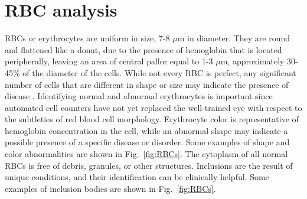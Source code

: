 \documentclass[final,a4paper,12pt,english]{UnicaPhdThesis3}
\begin{document}
{%
%

\chapter{RBC analysis}
RBCs or erythrocytes are uniform in size, 7-8 $\mu$m in diameter. They are round and flattened like a donut, due to the presence of hemoglobin that is located peripherally, leaving an area of central pallor equal to 1-3 $\mu$m, approximately 30-45\% of the diameter of the cells. While not every RBC is perfect, any significant number of cells that are different in shape or size may indicate the presence of disease \cite{Erhabor}. Identifying normal and abnormal erythrocytes is important since automated cell counters have not yet replaced the well-trained eye with respect to the subtleties of red blood cell morphology. Erythrocyte color is representative of hemoglobin concentration in the cell, while an abnormal shape may indicate a possible presence of a specific disease or disorder. Some examples of shape and color abnormalities are shown in Fig.~\ref{fig:RBCs}. The cytoplasm of all normal RBCs is free of debris, granules, or other structures. Inclusions are the result of unique conditions, and their identification can be clinically helpful. Some examples of inclusion bodies are shown in Fig.~\ref{fig:RBCs}.

}
\end{document}
